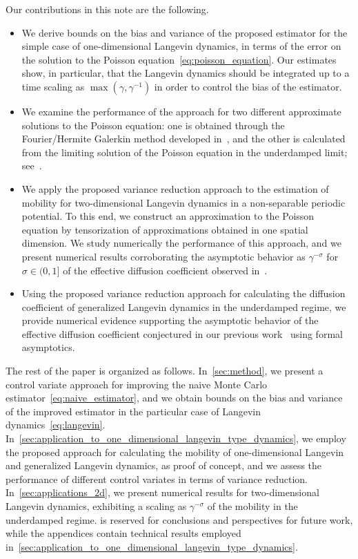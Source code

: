 \documentclass[11pt,a4paper]{article}
\theoremstyle{plain}
\numberwithin{equation}{section}
\begin{document}
Our contributions in this note are the following.
\begin{itemize}
    \item
        We derive bounds on the bias and variance of the proposed estimator for the simple case of one-dimensional Langevin dynamics,
        in terms of the error on the solution to the Poisson equation~\eqref{eq:poisson_equation}.
        Our estimates show, in particular, that the Langevin dynamics should be integrated up to a time scaling as $\max(\gamma, \gamma^{-1})$ in order to control the bias of the estimator.
    \item
        We examine the performance of the approach for two different approximate solutions to the Poisson equation:
        one is obtained through the Fourier/Hermite Galerkin method developed in~\cite{roussel2018spectral},
        and the other is calculated from the limiting solution of the Poisson equation in the underdamped limit;
        see~\cite{MR2427108}.
    \item
        We apply the proposed variance reduction approach to the estimation of mobility for two-dimensional Langevin dynamics in a non-separable periodic potential.
        To this end, we construct an approximation to the Poisson equation by tensorization of approximations obtained in one spatial dimension.
        We study numerically the performance of this approach,
        and we present numerical results corroborating the asymptotic behavior as $\gamma^{-\sigma}$ for $\sigma \in (0, 1]$ of the effective diffusion coefficient
        observed in~\cite{roussel_thesis}.
    \item
        Using the proposed variance reduction approach
        for calculating the diffusion coefficient of generalized Langevin dynamics in the underdamped regime,
        we provide numerical evidence supporting the asymptotic behavior of the effective diffusion coefficient conjectured in our previous work~\cite{GPGSUV21} using formal asymptotics.
\end{itemize}
The rest of the paper is organized as follows.
In~\cref{sec:method},
we present a control variate approach for improving the naive Monte Carlo estimator~\eqref{eq:naive_estimator},
and we obtain bounds on the bias and variance of the improved estimator in the particular case of Langevin dynamics~\eqref{eq:langevin}.
In~\cref{sec:application_to_one_dimensional_langevin_type_dynamics},
we employ the proposed approach for calculating the mobility of one-dimensional Langevin and generalized Langevin dynamics,
as proof of concept,
and we assess the performance of different control variates in terms of variance reduction.
In~\cref{sec:applications_2d},
we present numerical results for two-dimensional Langevin dynamics,
exhibiting a scaling as $\gamma^{-\sigma}$ of the mobility in the underdamped regime.
 is reserved for conclusions and perspectives for future work,
while the appendices contain technical results employed in~\cref{sec:application_to_one_dimensional_langevin_type_dynamics}.
\end{document}
